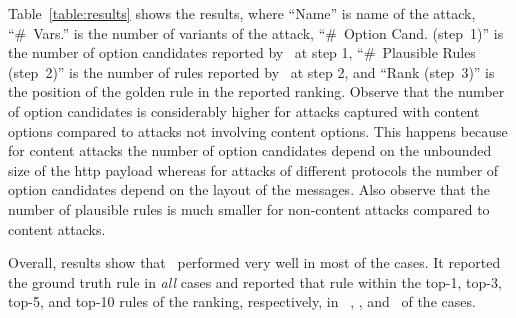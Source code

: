 \documentclass[conference]{IEEEtran}
\begin{document}


Table~\ref{table:results} shows the results, where ``Name'' is 
name of the attack, ``\#~Vars.'' is the number of variants
of the attack, ``\#~Option Cand. (step~1)'' is the number of
option candidates reported by \tname\ at step 1, ``\#~Plausible
Rules (step~2)'' is the number of rules reported by \tname\ at step
2, and  ``Rank (step~3)'' is the position of the golden rule
in the reported ranking. Observe that the number of option candidates
is considerably higher for attacks captured with content options
compared to attacks not involving content options. This happens
because for content attacks the number of option candidates depend on
the unbounded size of the http payload whereas for attacks of
different protocols the number of option candidates depend on the
layout of the messages. Also observe that the number of plausible
rules is much smaller for non-content attacks compared to content
attacks.


Overall, results show that \tname\ performed very well in most of the
cases. It reported the ground truth rule in \emph{all} cases and
reported that rule within the top-1, top-3, top-5, and top-10 rules of
the ranking, respectively, in \percTopOneRanking\,
\percTopThreeRanking, \percTopFiveRanking, and \percTopTenRanking\ of
the cases.



\end{document}
